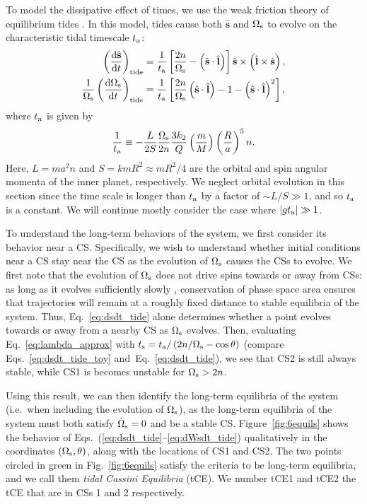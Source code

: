 \documentclass[
        fleqn,
        usenatbib,
    ]{mnras}
\newcommand*{\rd}[2]{\frac{\mathrm{d}#1}{\mathrm{d}#2}}
\newcommand*{\abs}[1]{\left|#1\right|}
\newcommand*{\p}[1]{\left(#1\right)}
\newcommand*{\s}[1]{\left[#1\right]}
\newcommand*{\uv}[1]{\hat{\mathbf{#1}}}
\begin{document}
To model the dissipative effect of times, we use the weak friction theory of
equilibrium tides \citep{lai2012}. In this model, tides cause both $\uv{s}$ and
$\Omega_{\rm s}$ to evolve on the characteristic tidal timescale $t_{\rm a}$:
\begin{align}
    \p{\rd{\uv{s}}{t}}_{\rm tide} &= \frac{1}{t_{\rm a}}
                \s{\frac{2n}{\Omega_{\rm s}} - \p{\uv{s} \cdot \uv{l}}}
                    \uv{s} \times \p{\uv{l} \times \uv{s}}\label{eq:dsdt_tide},\\
    \frac{1}{\Omega_{\rm s}}\p{\rd{\Omega_{\rm s}}{t}}_{\rm tide}
        &= \frac{1}{t_{\rm a}} \s{\frac{2n}{\Omega_{\rm s}}\p{\uv{s} \cdot
            \uv{l}} - 1 - \p{\uv{s} \cdot \uv{l}}^2},\label{eq:dWsdt_tide}
\end{align}
where $t_{\rm a}$ is given by
\begin{equation}
    \frac{1}{t_{\rm a}} \equiv -\frac{L}{2S} \frac{\Omega_{\rm
        s}}{2n}\frac{3k_2}{Q}\p{\frac{m}{M}}\p{\frac{R}{a}}^5 n.
\end{equation}
Here, $L = ma^2n$ and $S = kmR^2 \approx mR^2/4$ are the orbital and spin
angular momenta of the inner planet, respectively. We neglect orbital evolution
in this section since the time scale is longer than $t_{\rm a}$ by a factor of
$\sim L / S \gg 1$, and so $t_{\rm a}$ is a constant. We will continue mostly
consider the case where $\abs{gt_{\rm a}} \gg 1$.

To understand the long-term behaviors of the system, we first consider its
behavior near a CS\@. Specifically, we wish to understand whether initial
conditions near a CS stay near the CS as the evolution of $\Omega_{\rm s}$
causes the CSs to evolve. We first note that the evolution of
$\Omega_{\rm s}$ does not drive spins towards or away from CSs: as long as it
evolves sufficiently slowly \citep[adiabatically,][]{su2020}, conservation of
phase space area ensures that trajectories will remain at a roughly fixed
distance to stable equilibria of the system. Thus, Eq.~\eqref{eq:dsdt_tide}
alone determines whether a point evolves towards or away from a nearby CS as
$\Omega_{\rm s}$ evolves. Then, evaluating Eq.~\eqref{eq:lambda_approx} with
$t_{\rm s} = t_{\rm a} / \p{2n / \Omega_{\rm s} - \cos \theta}$ (compare
Eqs.~\ref{eq:dsdt_tide_toy} and~Eq.~\eqref{eq:dsdt_tide}), we see that CS2 is
still always stable, while CS1 is becomes unstable for $\Omega_{\rm s} > 2n$.

Using this result, we can then identify the long-term equilibria of the system
(i.e.\ when including the evolution of $\Omega_{\rm s}$), as the long-term
equilibria of the system must both satisfy $\dot{\Omega}_{\rm s} = 0$ and be a
stable CS\@. Figure~\ref{fig:6equils} shows the behavior of
Eqs.~(\ref{eq:dsdt_tide}--\ref{eq:dWsdt_tide}) qualitatively in the coordinates
$(\Omega_{\rm s}, \theta)$, along with the locations of CS1 and CS2. The two
points circled in green in Fig.~\ref{fig:6equils} satisfy the criteria to be
long-term equilibria, and we call them \emph{tidal Cassini Equilibria} (tCE). We
number tCE1 and tCE2 the tCE that are in CSs 1 and 2 respectively.
\end{document}
